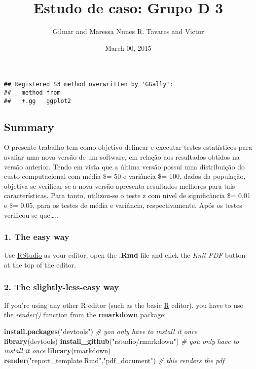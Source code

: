 \documentclass[]{article}
\title{Estudo de caso: Grupo D 3}
\author{Gilmar and Maressa Nunes R. Tavares and Victor}
\date{March 00, 2015}
\newenvironment{Shaded}{\begin{snugshade}}{\end{snugshade}}
\newcommand{\CommentTok}[1]{\textcolor[rgb]{0.56,0.35,0.01}{\textit{#1}}}
\newcommand{\KeywordTok}[1]{\textcolor[rgb]{0.13,0.29,0.53}{\textbf{#1}}}
\newcommand{\NormalTok}[1]{#1}
\newcommand{\StringTok}[1]{\textcolor[rgb]{0.31,0.60,0.02}{#1}}
\begin{document}
\maketitle

\begin{verbatim}
## Registered S3 method overwritten by 'GGally':
##   method from   
##   +.gg   ggplot2
\end{verbatim}

\hypertarget{summary}{%
\subsection{Summary}\label{summary}}

O presente trabalho tem como objetivo delinear e executar testes
estatísticos para avaliar uma nova versão de um software, em relação aos
resultados obtidos na versão anterior. Tendo em vista que a última
versão possui uma distribuição do custo computacional com média \$\mu =
50 e variância \$\sigma = 100, dados da população, objetiva-se verificar
se a nova versão apresenta resultados melhores para tais
características. Para tanto, utilizou-se o teste z com nível de
significância \$\alpha = 0,01 e \$\alpha = 0,05, para os testes de média
e variância, respectivamente. Após os testes verificou-se que\ldots{}..

\hypertarget{the-easy-way}{%
\subsubsection{1. The easy way}\label{the-easy-way}}

Use \href{http://rstudio.com/}{RStudio} as your editor, open the
\textbf{.Rmd} file and click the \emph{Knit PDF} button at the top of
the editor.

\hypertarget{the-slightly-less-easy-way}{%
\subsubsection{2. The slightly-less-easy
way}\label{the-slightly-less-easy-way}}

If you're using any other R editor (such as the basic
\href{http://cran.r-project.org}{R} editor), you have to use the
\emph{render()} function from the \textbf{rmarkdown} package:

\begin{Shaded}
\begin{Highlighting}[]
\KeywordTok{install.packages}\NormalTok{(}\StringTok{"devtools"}\NormalTok{)                    }\CommentTok{# you only have to install it once}
\KeywordTok{library}\NormalTok{(devtools)}
\KeywordTok{install_github}\NormalTok{(}\StringTok{"rstudio/rmarkdown"}\NormalTok{)             }\CommentTok{# you only have to install it once}
\KeywordTok{library}\NormalTok{(rmarkdown)}
\KeywordTok{render}\NormalTok{(}\StringTok{"report_template.Rmd"}\NormalTok{,}\StringTok{"pdf_document"}\NormalTok{)    }\CommentTok{# this renders the pdf}
\end{Highlighting}
\end{Shaded}
\end{document}
